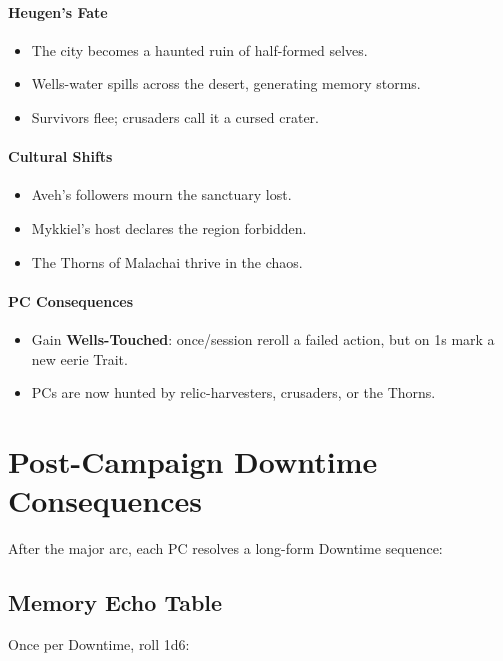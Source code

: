 \documentclass[11pt]{book}
\begin{document}
\paragraph{Heugen's Fate}
\begin{itemize}[leftmargin=*]
    \item The city becomes a haunted ruin of half-formed selves.
    \item Wells-water spills across the desert, generating memory storms.
    \item Survivors flee; crusaders call it a cursed crater.
\end{itemize}

\paragraph{Cultural Shifts}
\begin{itemize}[leftmargin=*]
    \item Aveh's followers mourn the sanctuary lost.
    \item Mykkiel's host declares the region forbidden.
    \item The Thorns of Malachai thrive in the chaos.
\end{itemize}

\paragraph{PC Consequences}
\begin{itemize}[leftmargin=*]
    \item Gain \textbf{Wells-Touched}: once/session reroll a failed action, but on 1s mark a new eerie Trait.
    \item PCs are now hunted by relic-harvesters, crusaders, or the Thorns.
\end{itemize}

\section{Post-Campaign Downtime Consequences}

After the major arc, each PC resolves a long-form Downtime sequence:

\subsection{Memory Echo Table}
Once per Downtime, roll 1d6:
\end{document}
